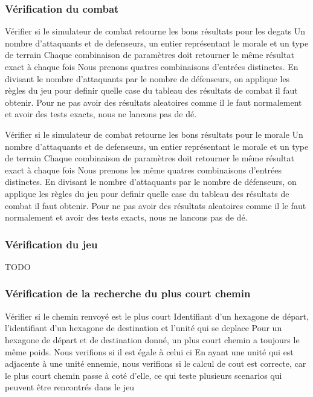 \subsubsection{Vérification du combat}

\mytest
{Vérifier si le simulateur de combat retourne les bons résultats pour les degats}
{Un nombre d'attaquants et de defenseurs, un entier représentant le morale et un type de terrain}
{Chaque combinaison de paramètres doit retourner le même résultat exact à chaque fois}
{Nous prenons quatres combinaisons d'entrées distinctes. 
En divisant le nombre d'attaquants par le nombre de défenseurs, on applique les règles du jeu pour definir
quelle case du tableau des résultats de combat il faut obtenir. Pour ne pas avoir des résultats aleatoires comme
il le faut normalement et avoir des tests exacts, nous ne lancons pas de dé.}

\mytest
{Vérifier si le simulateur de combat retourne les bons résultats pour le morale}
{Un nombre d'attaquants et de defenseurs, un entier représentant le morale et un type de terrain}
{Chaque combinaison de paramètres doit retourner le même résultat exact à chaque fois}
{Nous prenons les même quatres combinaisons d'entrées distinctes. 
En divisant le nombre d'attaquants par le nombre de défenseurs, on applique les règles du jeu pour definir
quelle case du tableau des résultats de combat il faut obtenir. Pour ne pas avoir des résultats aleatoires comme
il le faut normalement et avoir des tests exacts, nous ne lancons pas de dé.}


\subsubsection{Vérification du jeu}

TODO

\subsubsection{Vérification de la recherche du plus court chemin}

\mytest
{Vérifier si le chemin renvoyé est le plus court}
{Identifiant d'un hexagone de départ, l'identifiant d'un hexagone de destination et l'unité qui se deplace}
{Pour un hexagone de départ et de destination donné, un plus court chemin a toujours le même poids. Nous verifions
si il est égale à celui ci}
{En ayant une unité qui est adjacente à une unité ennemie, nous verifions si le calcul de cout est correcte, car
le plus court chemin passe à coté d'elle, ce qui teste plusieurs scenarios qui peuvent être rencontrés dans le jeu}


